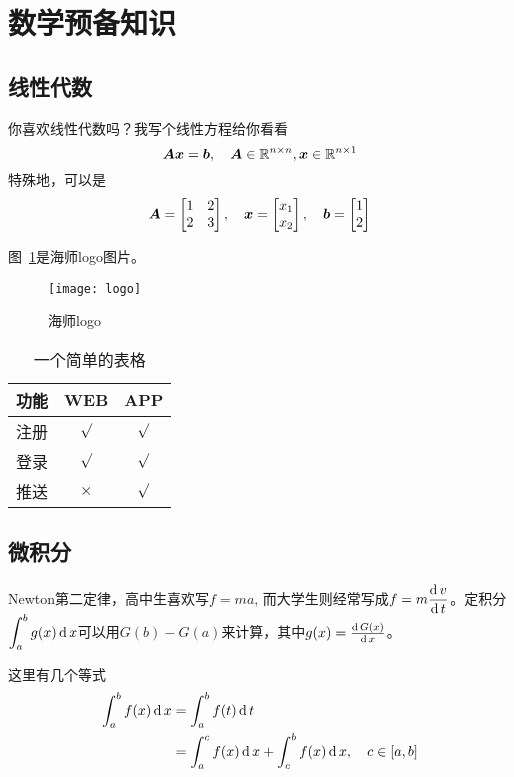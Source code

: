 \appendices
\section{数学预备知识}
\subsection{线性代数}
你喜欢线性代数吗？我写个线性方程给你看看
\begin{equation}
	\bm{A} \bm{x}= \bm{b}, \quad \bm{A}\in \mathbb{R}^{{n}\times {n}}, \bm{x}\in \mathbb{R}^{{n}\times {1}}
\end{equation}
特殊地，可以是
\begin{equation}
	\bm{A} = \begin{bmatrix}
		1 & 2 \\
		2 & 3 
	\end{bmatrix},\quad
	\bm{x}=\begin{bmatrix}
		x_1 \\ x_2
	\end{bmatrix}, \quad
	\bm{b} =\begin{bmatrix}
		1 \\ 2
	\end{bmatrix}
\end{equation}

图~\ref{hnulogo}是海师logo图片。
\begin{figure}[hp]
	\centering
	\texttt{[image: logo]}
	\caption{海师logo}
	\label{hnulogo}
\end{figure}

\begin{table}[htp]
	\caption{一个简单的表格}\label{tab1}
	\centering
	\begin{tabular}{|l|c|c|}
		\hline
		功能          &WEB         &APP         \\ \hline
		注册          &$\surd$     &$\surd$     \\ \hline
		登录          &$\surd$     &$\surd$     \\ \hline
		推送          &$\times$    &$\surd$     \\ \hline
	\end{tabular}
\end{table}

\subsection{微积分}
Newton第二定律，高中生喜欢写$f=ma$, 而大学生则经常写成$\displaystyle{f=m\frac{\operatorname{\mathrm{d}}{v}}{\operatorname{\mathrm{d}}{t}}}$。定积分
$\displaystyle{\int^b_a g(x)\operatorname{\mathrm{d}}x}$可以用$G(b)-G(a)$来计算，其中$g(x) = \frac{\operatorname{\mathrm{d}} {G(x)}}{\operatorname{\mathrm{d}} {x}}$。

这里有几个等式
\begin{equation}
	\begin{split}
		\int^b_a f(x)\operatorname{\mathrm{d}} x 
		& = \int^b_a f(t)\operatorname{\mathrm{d}} t \\
		& = \int^c_a f(x)\operatorname{\mathrm{d}} x + \int^b_c f(x)\operatorname{\mathrm{d}} x, \quad c\in [a,b] 
	\end{split}
\end{equation}
